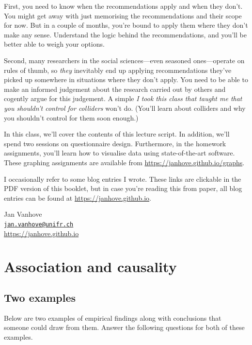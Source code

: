 \documentclass[a4paper]{tufte-book}\usepackage[]{graphicx}\usepackage[]{xcolor}
\begin{document}
First, you need to know when the recommendations apply and when they don't.
You might get away with just memorising the recommendations and their scope
for now. But in a couple of months, you're bound to apply them where they don't make
any sense.
Understand the logic behind the recommendations, and you'll be better 
able to weigh your options.

Second, many researchers in the social sciences---even seasoned ones---operate
on rules of thumb, so \emph{they} inevitably end up applying recommendations they've 
picked up somewhere in situations where they don't apply. You need to be able
to make an informed judgement about the research carried out by others and
cogently argue for this judgement. A simple \textit{I took this class that taught
me that you shouldn't control for colliders} won't do.
(You'll learn about colliders and why you shouldn't control for them soon enough.)

In this class, we'll cover the contents of this lecture script.
In addition, we'll spend two sessions on questionnaire design.
Furthermore, in the homework assignments, you'll learn how to visualise data 
using state-of-the-art software. 
These graphing assignments are available from \url{https://janhove.github.io/graphs}.

I occasionally refer to some blog entries I wrote.
These links are clickable in the PDF version of this booklet,
but in case you're reading this from paper, all blog entries
can be found at \url{https://janhove.github.io}.

\medskip

\begin{flushright}
Jan Vanhove\\
\href{mailto:jan.vanhove@unifr.ch}{\texttt{jan.vanhove@unifr.ch}}\\
\url{https://janhove.github.io}
\end{flushright}

{\fontsize{9.5pt}{11pt}\selectfont
  \tableofcontents
}





\mainmatter


\chapter{Association and causality}\label{ch:causality}

\section{Two examples}
Below are two examples of empirical findings 
along with conclusions that someone could draw from them.
Answer the following questions for both of these examples.
\end{document}
